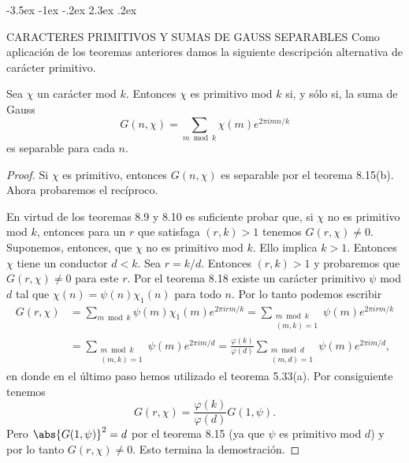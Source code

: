 \documentclass[12pt,a4paper]{book}
\makeatletter
\renewcommand\section{\@startsection{section}{1}{\z@}%
  {-3.5ex \@plus -1ex \@minus -.2ex}%
  {2.3ex \@plus .2ex}%
  {\normalfont\Large\bfseries\raggedright}}
\makeatother
\begin{document}
    \section{CARACTERES PRIMITIVOS Y SUMAS DE GAUSS SEPARABLES}
    Como aplicación de los teoremas anteriores damos la siguiente descripción alternativa de
    carácter primitivo.

    \begin{teorema}
        Sea $\chi$ un carácter mod $k$. Entonces $\chi$ es primitivo mod $k$ si, y sólo si,
        la suma de Gauss
        \begin{equation*}
            G(n,\chi)=\sum_{m\bmod k}\chi(m)e^{2\pi imn/k}
        \end{equation*}
        es separable para cada $n$.
    \end{teorema}

    \begin{proof}
        Si $\chi$ es primitivo, entonces $G(n,\chi)$ es separable por el teorema 8.15(b).
        Ahora probaremos el recíproco.

        En virtud de los teoremas 8.9 y 8.10 es suficiente probar que, si $\chi$ no es
        primitivo mod $k$, entonces para un $r$ que satisfaga $(r,k)>1$ tenemos
        $G(r,\chi)\neq0$. Suponemos, entonces, que $\chi$ no es primitivo mod $k$. Ello
        implica $k>1$. Entonces $\chi$ tiene un conductor $d<k$. Sea $r=k/d$. Entonces
        $(r,k)>1$ y probaremos que $G(r,\chi)\neq0$ para este $r$. Por el teorema 8.18
        existe un carácter primitivo $\psi$ mod $d$ tal que $\chi(n)=\psi(n)\chi_{1}(n)$ para
        todo $n$. Por lo tanto podemos escribir
        \begin{align*}
            G(r,\chi)&=\sum_{m\bmod k}\psi(m)\chi_{1}(m)e^{2\pi irm/k}=\sum_{\substack{m\bmod k\\(m,k)=1}}\psi(m)e^{2\pi irm/k}\\
            &=\sum_{\substack{m\bmod k\\(m,k)=1}}\psi(m)e^{2\pi im/d}=\frac{\varphi(k)}{\varphi(d)}\sum_{\substack{m\bmod d\\(m,d)=1}}\psi(m)e^{2\pi im/d},
        \end{align*}
        en donde en el último paso hemos utilizado el teorema 5.33(a). Por consiguiente
        tenemos
        \begin{equation*}
            G(r,\chi)=\frac{\varphi(k)}{\varphi(d)}G(1,\psi).
        \end{equation*}
        Pero $\abs{G(1,\psi)}^{2}=d$ por el teorema 8.15 (ya que $\psi$ es primitivo mod $d$)
        y por lo tanto $G(r,\chi)\neq0$. Esto termina la demostración.
    \end{proof}
\end{document}
